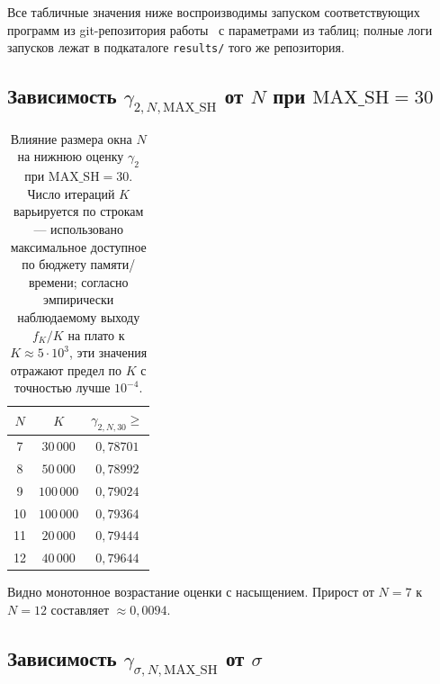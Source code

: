Все табличные значения ниже воспроизводимы запуском соответствующих программ из git-репозитория работы~\cite{ourgithub} с параметрами из таблиц; полные логи запусков лежат в подкаталоге \texttt{results/} того же репозитория.

\subsection*{Зависимость $\gamma_{2, N, \mathrm{MAX\_SH}}$ от $N$ при $\mathrm{MAX\_SH} = 30$}

\begin{table}[h!]
\caption{Влияние размера окна $N$ на нижнюю оценку $\gamma_2$ при $\mathrm{MAX\_SH} = 30$. Число итераций $K$ варьируется по строкам --- использовано максимальное доступное по бюджету памяти/времени; согласно эмпирически наблюдаемому выходу $f_K/K$ на плато к $K \approx 5 \cdot 10^3$, эти значения отражают предел по $K$ с точностью лучше $10^{-4}$.}
\label{tab:N-dep-appendix}
\centering
\begin{tabular}{|c|c|c|}
\hline
$N$ & $K$ & $\gamma_{2, N, 30} \geq$ \\
\hline
7  & $30\,000$  & $0{,}78701$ \\
8  & $50\,000$  & $0{,}78992$ \\
9  & $100\,000$ & $0{,}79024$ \\
10 & $100\,000$ & $0{,}79364$ \\
11 & $20\,000$  & $0{,}79444$ \\
12 & $40\,000$  & $0{,}79644$ \\
\hline
\end{tabular}
\end{table}

Видно монотонное возрастание оценки с насыщением. Прирост от $N = 7$ к $N = 12$ составляет $\approx 0{,}0094$.

\subsection*{Зависимость $\gamma_{\sigma, N, \mathrm{MAX\_SH}}$ от $\sigma$}


